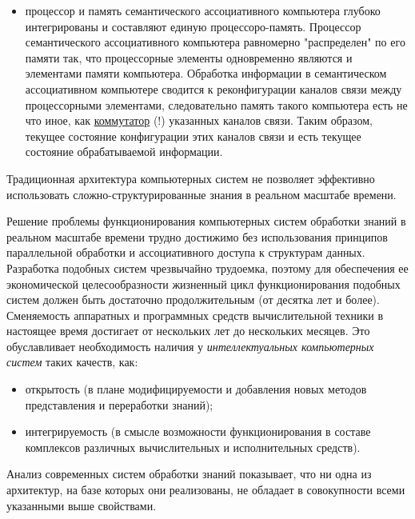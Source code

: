 \begin{itemize}
	\item процессор и память семантического ассоциативного компьютера глубоко интегрированы и составляют единую процессоро-память. Процессор семантического ассоциативного компьютера равномерно "распределен"{} по его памяти так, что процессорные элементы одновременно являются и элементами памяти компьютера. Обработка информации в семантическом ассоциативном компьютере сводится к реконфигурации каналов связи между процессорными элементами,  следовательно память такого компьютера есть не что иное, как \uline{коммутатор} (!) указанных каналов связи. Таким образом, текущее состояние конфигурации этих каналов связи и есть текущее состояние обрабатываемой информации.
\end{itemize}

Традиционная архитектура компьютерных систем не позволяет эффективно использовать сложно-структурированные знания в реальном масштабе времени.
	
Решение проблемы функционирования компьютерных систем обработки знаний в реальном масштабе времени трудно достижимо без использования принципов параллельной обработки и ассоциативного доступа к структурам данных. Разработка подобных систем чрезвычайно трудоемка, поэтому для обеспечения ее экономической целесообразности жизненный цикл функционирования подобных систем должен быть достаточно продолжительным (от десятка лет и более). Сменяемость аппаратных и программных средств вычислительной техники в настоящее время достигает от нескольких лет до нескольких месяцев. Это обуславливает необходимость наличия у \textit{интеллектуальных компьютерных систем} таких качеств, как:
\begin{itemize}
	\item открытость (в плане модифицируемости и добавления новых методов представления и переработки знаний);
	\item интегрируемость (в смысле возможности функционирования в составе комплексов различных вычислительных и исполнительных средств).
\end{itemize}	   
Анализ современных систем обработки знаний показывает, что ни одна из архитектур, на базе которых они реализованы, не обладает в совокупности всеми указанными выше свойствами.
	
